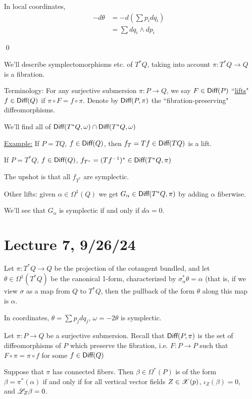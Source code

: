 \documentclass[x11names,reqno,14pt]{extarticle}
\begin{document}
\proof

In local coordinates, 
\begin{align*}
-d\theta & = -d\left(\sum p_idq_i\right) \\
& = \sum dq_i\wedge dp_i
\end{align*}

\qed

We'll describe symplectomorphisms etc. of $T^*Q$, taking into account $\pi:T^*Q\to Q$ is a fibration.

Terminology: For any surjective submersion $\pi:P\to Q$, we say $F\in{{\text{\sffamily {Diff}}}}(P)$ ``\underline{lifts}" $f \in {{\text{\sffamily {Diff}}}}(Q)$ if $\pi\circ F = f\circ \pi$. Denote by ${{\text{\sffamily {Diff}}}}(P,\pi)$ the ``fibration-preserving" diffeomorphisms.

We'll find all of ${{\text{\sffamily {Diff}}}}(T^*Q,\omega) \cap {{\text{\sffamily {Diff}}}}(T^*Q,\omega)$

\underline{Example:} If $P = TQ$, $f \in {{\text{\sffamily {Diff}}}}(Q)$, then $f_T = Tf \in {{\text{\sffamily {Diff}}}}(TQ)$ is a lift.

If $P = T^*Q$, $f \in {{\text{\sffamily {Diff}}}}(Q)$, $f_{T^*} = (Tf^{-1})^*\in{{\text{\sffamily {Diff}}}}(T^*Q,\pi)$

The upshot is that all $f_{T^*}$ are symplectic. 

Other lifts: given $\alpha\in \Omega^1(Q)$ we get $G_\alpha\in{{\text{\sffamily {Diff}}}}(T^*Q,\pi)$ by adding $\alpha$ fiberwise. 

We'll see that $G_\alpha$ is symplectic if and only if $d\alpha = 0$. 

\section*{Lecture 7, 9/26/24}

Let $\pi:T^*Q\to Q$ be the projection of the cotangent bundled, and let $\theta \in \Omega^1(T^*Q)$ be the canonical 1-form, characterized by $\sigma_\alpha^*\theta = \alpha$ (that is, if we view $\sigma$ as a map from $Q$ to $T^*Q$, then the pullback of the form $\theta$ along this map is $\alpha$. 

In coordinates, $\theta = \sum p_jdq_j$, $\omega = -2\theta$ is symplectic.

Let $\pi:P\to Q$ be a surjective submersion. Recall that ${{\text{\sffamily {Diff}}}}(P,\pi)$ is the set of diffeomorphisms of $P$ which preserve the fibration, i.e. $F:P\to P$ such that $F\circ\pi= \pi\circ f$ for some $f \in {{\text{\sffamily {Diff}}}}(Q)$

\lem

Suppose that $\pi$ has connected fibers. Then $\beta\in\Omega^*(P)$ is of the form $\beta = \pi^*(\alpha)$ if and only if for all vertical vector fields $Z \in \mathscr{X}(p)$, $\iota_Z(\beta) = 0$, and $\mathscr{L}_Z\beta=0$.
\end{document}
